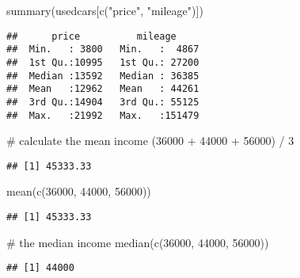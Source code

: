 \documentclass[
]{article}
\newenvironment{Shaded}{\begin{snugshade}}{\end{snugshade}}
\newcommand{\CommentTok}[1]{\textcolor[rgb]{0.50,0.62,0.50}{#1}}
\newcommand{\DecValTok}[1]{\textcolor[rgb]{0.86,0.86,0.80}{#1}}
\newcommand{\FunctionTok}[1]{\textcolor[rgb]{0.94,0.94,0.56}{#1}}
\newcommand{\NormalTok}[1]{\textcolor[rgb]{0.80,0.80,0.80}{#1}}
\newcommand{\SpecialCharTok}[1]{\textcolor[rgb]{0.86,0.64,0.64}{#1}}
\newcommand{\StringTok}[1]{\textcolor[rgb]{0.80,0.58,0.58}{#1}}
\begin{document}
\begin{Shaded}
\begin{Highlighting}[]
\FunctionTok{summary}\NormalTok{(usedcars[}\FunctionTok{c}\NormalTok{(}\StringTok{"price"}\NormalTok{, }\StringTok{"mileage"}\NormalTok{)])}
\end{Highlighting}
\end{Shaded}

\begin{verbatim}
##      price          mileage      
##  Min.   : 3800   Min.   :  4867  
##  1st Qu.:10995   1st Qu.: 27200  
##  Median :13592   Median : 36385  
##  Mean   :12962   Mean   : 44261  
##  3rd Qu.:14904   3rd Qu.: 55125  
##  Max.   :21992   Max.   :151479
\end{verbatim}

\begin{Shaded}
\begin{Highlighting}[]
\CommentTok{\# calculate the mean income}
\NormalTok{(}\DecValTok{36000} \SpecialCharTok{+} \DecValTok{44000} \SpecialCharTok{+} \DecValTok{56000}\NormalTok{) }\SpecialCharTok{/} \DecValTok{3}
\end{Highlighting}
\end{Shaded}

\begin{verbatim}
## [1] 45333.33
\end{verbatim}

\begin{Shaded}
\begin{Highlighting}[]
\FunctionTok{mean}\NormalTok{(}\FunctionTok{c}\NormalTok{(}\DecValTok{36000}\NormalTok{, }\DecValTok{44000}\NormalTok{, }\DecValTok{56000}\NormalTok{))}
\end{Highlighting}
\end{Shaded}

\begin{verbatim}
## [1] 45333.33
\end{verbatim}

\begin{Shaded}
\begin{Highlighting}[]
\CommentTok{\# the median income}
\FunctionTok{median}\NormalTok{(}\FunctionTok{c}\NormalTok{(}\DecValTok{36000}\NormalTok{, }\DecValTok{44000}\NormalTok{, }\DecValTok{56000}\NormalTok{))}
\end{Highlighting}
\end{Shaded}

\begin{verbatim}
## [1] 44000
\end{verbatim}
\end{document}
